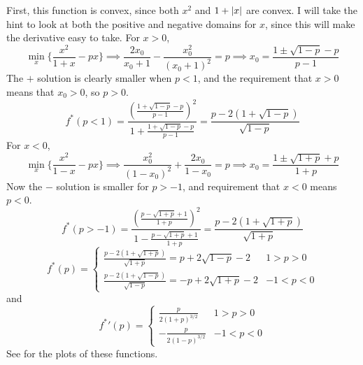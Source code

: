 \documentclass[a4paper,twoside]{article}
\begin{document}
\begin{problem}
    First, this function is convex, since both $ x^2 $ and $ 1 + \abs{x} $ are convex. I will take the hint to look at both the positive and negative domains for $ x $, since this will make the derivative easy to take. For $ x > 0 $,
    \begin{equation}
        \min_x \{\frac{x^2}{1+x} - px\} \implies \frac{2 x_0}{x_0+1}-\frac{x_0^2}{(x_0+1)^2} = p \implies x_0 = \frac{1 \pm \sqrt{1 - p} - p}{p - 1}
    \end{equation}
    The $ + $ solution is clearly smaller when $ p < 1 $, and the requirement that $ x > 0 $ means that $ x_0 > 0 $, so $ p > 0 $. 
    \begin{equation}
        f^*(p < 1) = \frac{\left( \frac{1 + \sqrt{1 - p} - p}{p - 1} \right)^2}{1 + \frac{1 + \sqrt{1 - p} - p}{p - 1}} = \frac{p - 2 (1 + \sqrt{1 - p})}{\sqrt{1 - p}}
    \end{equation}
    For $ x < 0 $,
    \begin{equation}
        \min_x \{\frac{x^2}{1-x} - px\} \implies \frac{x_0^2}{(1-x_0)^2}+\frac{2 x_0}{1-x_0} = p \implies x_0 = \frac{1 \pm \sqrt{1 + p} + p}{1 + p}
    \end{equation}
    Now the $ - $ solution is smaller for $ p > -1 $, and requirement that $ x < 0 $ means $ p < 0 $.
    \begin{equation}
        f^*(p > -1) = \frac{\left(\frac{p-\sqrt{1 + p}+1}{1 + p}\right)^2}{1-\frac{p-\sqrt{1 + p}+1}{1 + p}} = \frac{p - 2 (1 + \sqrt{1 + p})}{\sqrt{1 + p}}
    \end{equation}
    \begin{equation}
        f^*(p) = \begin{cases} \frac{p - 2 (1 + \sqrt{1 + p})}{\sqrt{1 + p}} = p + 2 \sqrt{1-p} - 2 & 1 > p > 0 \\ \frac{p - 2 (1 + \sqrt{1 - p})}{\sqrt{1 - p}} = -p + 2 \sqrt{1+p} - 2 & -1 < p < 0 \end{cases}
    \end{equation}
    and
    \begin{equation}
        {f^*}'(p) = \begin{cases} \frac{p}{2 (1 + p)^{3/2}} & 1 > p > 0 \\ -\frac{p}{2 (1-p)^{3/2}} & -1 < p < 0 \end{cases} 
    \end{equation}
    See  for the plots of these functions.
\end{problem}
\end{document}
